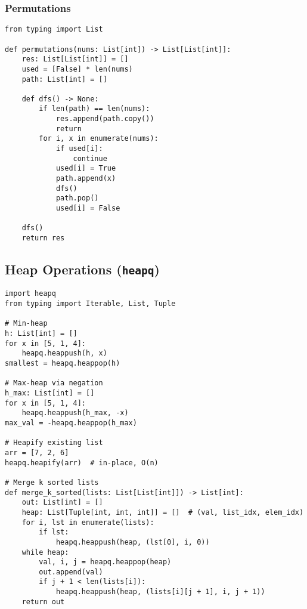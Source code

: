 \documentclass[11pt]{article}
\begin{document}
\subsubsection*{Permutations}
\begin{lstlisting}[style=py,caption={Permutations using used[] flag}]
from typing import List

def permutations(nums: List[int]) -> List[List[int]]:
    res: List[List[int]] = []
    used = [False] * len(nums)
    path: List[int] = []

    def dfs() -> None:
        if len(path) == len(nums):
            res.append(path.copy())
            return
        for i, x in enumerate(nums):
            if used[i]:
                continue
            used[i] = True
            path.append(x)
            dfs()
            path.pop()
            used[i] = False

    dfs()
    return res
\end{lstlisting}

\subsection{Heap Operations (\texttt{heapq})}
\begin{lstlisting}[style=py,caption={Min-heap, max-heap idioms, k-way merge}]
import heapq
from typing import Iterable, List, Tuple

# Min-heap
h: List[int] = []
for x in [5, 1, 4]:
    heapq.heappush(h, x)
smallest = heapq.heappop(h)

# Max-heap via negation
h_max: List[int] = []
for x in [5, 1, 4]:
    heapq.heappush(h_max, -x)
max_val = -heapq.heappop(h_max)

# Heapify existing list
arr = [7, 2, 6]
heapq.heapify(arr)  # in-place, O(n)

# Merge k sorted lists
def merge_k_sorted(lists: List[List[int]]) -> List[int]:
    out: List[int] = []
    heap: List[Tuple[int, int, int]] = []  # (val, list_idx, elem_idx)
    for i, lst in enumerate(lists):
        if lst:
            heapq.heappush(heap, (lst[0], i, 0))
    while heap:
        val, i, j = heapq.heappop(heap)
        out.append(val)
        if j + 1 < len(lists[i]):
            heapq.heappush(heap, (lists[i][j + 1], i, j + 1))
    return out
\end{lstlisting}

\end{document}
